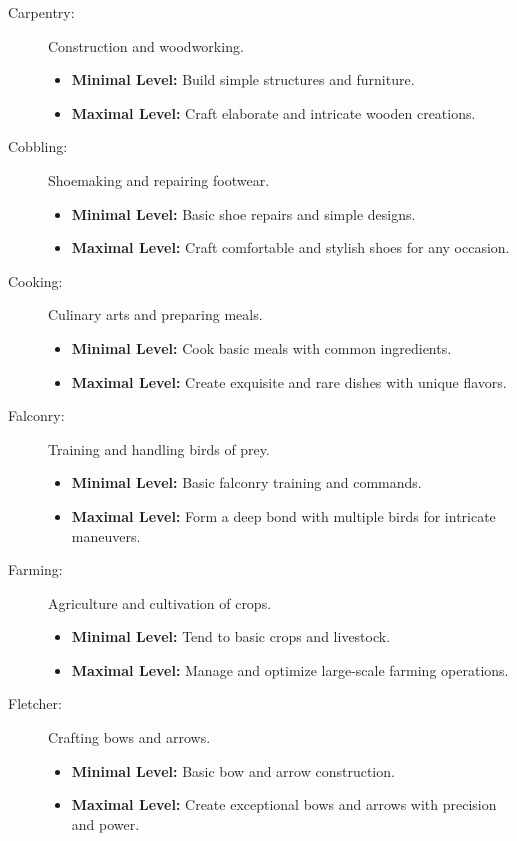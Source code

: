 \documentclass[12pt]{book}  %
\begin{document}
\begin{description}
    \item[Carpentry:] Construction and woodworking.
        \begin{itemize}
            \item \textbf{Minimal Level:} Build simple structures and furniture.
            \item \textbf{Maximal Level:} Craft elaborate and intricate wooden creations.
        \end{itemize}

    \item[Cobbling:] Shoemaking and repairing footwear.
        \begin{itemize}
            \item \textbf{Minimal Level:} Basic shoe repairs and simple designs.
            \item \textbf{Maximal Level:} Craft comfortable and stylish shoes for any occasion.
        \end{itemize}

    \item[Cooking:] Culinary arts and preparing meals.
        \begin{itemize}
            \item \textbf{Minimal Level:} Cook basic meals with common ingredients.
            \item \textbf{Maximal Level:} Create exquisite and rare dishes with unique flavors.
        \end{itemize}

    \item[Falconry:] Training and handling birds of prey.
        \begin{itemize}
            \item \textbf{Minimal Level:} Basic falconry training and commands.
            \item \textbf{Maximal Level:} Form a deep bond with multiple birds for intricate maneuvers.
        \end{itemize}

    \item[Farming:] Agriculture and cultivation of crops.
        \begin{itemize}
            \item \textbf{Minimal Level:} Tend to basic crops and livestock.
            \item \textbf{Maximal Level:} Manage and optimize large-scale farming operations.
        \end{itemize}

    \item[Fletcher:] Crafting bows and arrows.
        \begin{itemize}
            \item \textbf{Minimal Level:} Basic bow and arrow construction.
            \item \textbf{Maximal Level:} Create exceptional bows and arrows with precision and power.
        \end{itemize}


\end{description}
\end{document}
